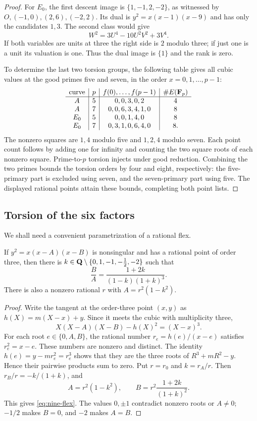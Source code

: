\begin{proof}
For $E_0$, the first descent image is $\{1,-1,2,-2\}$, as witnessed
by $O,(-1,0),(2,6),(-2,2)$.  Its dual is
$y^2=x(x-1)(x-9)$ and has only the candidates $1,3$.
The second class would give
\[
 W^2=3U^4-10U^2V^2+3V^4.
\]
If both variables are units at three the right side is $2$ modulo
three; if just one is a unit its valuation is one.  Thus the dual
image is $\{1\}$ and the rank is zero.

To determine the last two torsion groups, the following table gives
all cubic values at the good primes five and seven, in the order
$x=0,1,\ldots,p-1$:
\[
\begin{array}{c|c|c|c}
\text{curve}&p&f(0),\ldots,f(p-1)&\#E(\mathbf F_p)\\\hline
 A&5&0,0,3,0,2&4\\
 A&7&0,0,6,3,4,1,0&8\\
 E_0&5&0,0,1,4,0&8\\
 E_0&7&0,3,1,0,6,4,0&8.
\end{array}
\]
The nonzero squares are $1,4$ modulo five and $1,2,4$ modulo seven.
Each point count follows by adding one for infinity and counting the
two square roots of each nonzero square.  Prime-to-$p$ torsion injects
under good reduction.  Combining the two primes bounds the torsion
orders by four and eight, respectively: the five-primary part is
excluded using seven, and the seven-primary part using five.
The displayed rational points attain these bounds, completing both
point lists.
\end{proof}

\subsection{Torsion of the six factors}

We shall need a convenient parametrization of a rational flex.
\begin{lemma}\label{lem:nine-flex}
If $y^2=x(x-A)(x-B)$ is nonsingular and has a rational point of order
three, then there is $k\in\mathbf Q\setminus\{0,1,-1,-\tfrac12,-2\}$ such that
\begin{equation}\label{eq:nine-flex}
 \frac BA=\frac{1+2k}{(1-k)(1+k)^3}.
\end{equation}
There is also a nonzero rational $r$ with $A=r^2(1-k^2)$.
\end{lemma}
\begin{proof}
Write the tangent at the order-three point $(x,y)$ as
$h(X)=m(X-x)+y$.  Since it meets the cubic with multiplicity three,
\[
 X(X-A)(X-B)-h(X)^2=(X-x)^3.
\]
For each root $e\in\{0,A,B\}$, the rational number
$r_e=h(e)/(x-e)$ satisfies $r_e^2=x-e$.  These numbers are nonzero
and distinct.  The identity $h(e)=y-mr_e^2=r_e^3$ shows that they are
the three roots of $R^3+mR^2-y$.  Hence their pairwise products sum
to zero.  Put $r=r_0$ and $k=r_A/r$.  Then
$r_B/r=-k/(1+k)$, and
\[
 A=r^2(1-k^2),\qquad B=r^2\frac{1+2k}{(1+k)^2}.
\]
This gives \eqref{eq:nine-flex}.  The values $0,\pm1$ contradict
nonzero roots or $A\ne0$; $-1/2$ makes $B=0$, and $-2$ makes $A=B$.
\end{proof}

